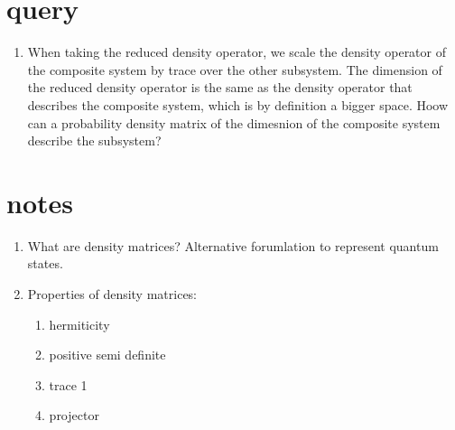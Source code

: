 \documentclass[a4paper,12pt]{amsbook}
\newcommand{\0}{{$|0\rangle$}}
\newcommand{\1}{{$|1\rangle$}}
\begin{document}
\section{query}
\begin{enumerate}
    \item When taking the reduced density operator, we scale the density operator of the composite system by trace over the other subsystem. The dimension of the reduced density operator is the same as the density operator that describes the composite system, which is by definition a bigger space. Hoow can a probability density matrix of the dimesnion of the composite system describe the subsystem?
\end{enumerate}

\section{notes}
\begin{enumerate}
    \item What are density matrices? Alternative forumlation to represent quantum states.
    \item Properties of density matrices:\begin{enumerate} \item hermiticity \item positive semi definite \item trace 1 \item projector \end{enumerate}
\end{enumerate}
\end{document}
